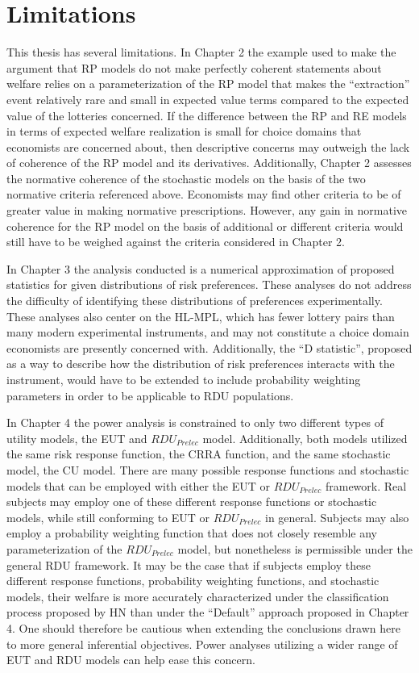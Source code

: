 \documentclass[../main.tex]{subfiles}
\begin{document}
\section{Limitations}
This thesis has several limitations.
In Chapter 2 the example used to make the argument that RP models do not make perfectly coherent statements about welfare relies on a parameterization of the RP model that makes the \enquote{extraction} event relatively rare and small in expected value terms compared to the expected value of the lotteries concerned.
If the difference between the RP and RE models in terms of expected welfare realization is small for choice domains that economists are concerned about, then descriptive concerns may outweigh the lack of coherence of the RP model and its derivatives.
Additionally, Chapter 2 assesses the normative coherence of the stochastic models on the basis of the two normative criteria referenced above.
Economists may find other criteria to be of greater value in making normative prescriptions.
However, any gain in normative coherence for the RP model on the basis of additional or different criteria would still have to be weighed against the criteria considered in Chapter 2.

In Chapter 3 the analysis conducted is a numerical approximation of proposed statistics for given distributions of risk preferences.
These analyses do not address the difficulty of identifying these distributions of preferences experimentally.
These analyses also center on the HL-MPL, which has fewer lottery pairs than many modern experimental instruments, and may not constitute a choice domain economists are presently concerned with.
Additionally, the \enquote{D statistic}, proposed as a way to describe how the distribution of risk preferences interacts with the instrument, would have to be extended to include probability weighting parameters in order to be applicable to RDU populations.

In Chapter 4 the power analysis is constrained to only two different types of utility models, the EUT and $\mathit{RDU_{Prelec}}$ model.
Additionally, both models utilized the same risk response function, the CRRA function, and the same stochastic model, the CU model.
There are many possible response functions and stochastic models that can be employed with either the EUT or $\mathit{RDU_{Prelec}}$ framework.
Real subjects may employ one of these different response functions or stochastic models, while still conforming to EUT or $\mathit{RDU_{Prelec}}$ in general.
Subjects may also employ a probability weighting function that does not closely resemble any parameterization of the $\mathit{RDU_{Prelec}}$ model, but nonetheless is permissible under the general RDU framework.
It may be the case that if subjects employ these different response functions, probability weighting functions, and stochastic models, their welfare is more accurately characterized under the classification process proposed by HN than under the \enquote{Default} approach proposed in Chapter 4.
One should therefore be cautious when extending the conclusions drawn here to more general inferential objectives.
Power analyses utilizing a wider range of EUT and RDU models can help ease this concern.
\end{document}
